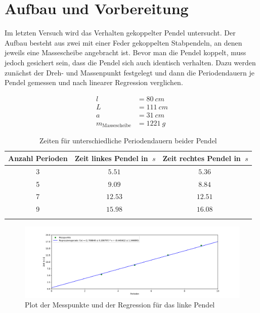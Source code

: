 \section{Aufbau und Vorbereitung}

Im letzten Versuch wird das Verhalten gekoppelter Pendel untersucht. Der Aufbau besteht aus zwei mit einer Feder gekoppelten Stabpendeln, an denen jeweils eine Massescheibe angebracht ist.
Bevor man die Pendel koppelt, muss jedoch gesichert sein, dass die Pendel sich auch identisch verhalten.
Dazu werden zunächst der Dreh- und Massenpunkt festgelegt und dann die Periodendauern je Pendel gemessen und nach linearer Regression verglichen.

\begin{align}
    l &= \SI{80}{cm} \\
    L &= \SI{111}{cm} \\
    a &= \SI{31}{cm} \\
    m_{\text{Massescheibe}} &= \SI{1221}{g}
\end{align}

\begin{table}[h!]
    \begin{center}
        \caption{Zeiten für unterschiedliche Periodendauern beider Pendel}
        \begin{tabular}{ccc}
            \hline
            Anzahl Perioden & Zeit linkes Pendel in $\SI{}{s}$ & Zeit rechtes Pendel in $\SI{}{s}$ \\
            \hline
            3  & $\SI{5,51}{}$ & $\SI{5,36}{}$ \\
            5  & $\SI{9,09}{}$ & $\SI{8,84}{}$  \\
            7  & $\SI{12,53}{}$ & $\SI{12,51}{}$  \\
            9  & $\SI{15,98}{}$ & $\SI{16,08}{}$ \\
            \hline
            \label{tab:Schwingungen-Pendel-einzeln}
        \end{tabular}
    \end{center}
\end{table}

\begin{figure}[h!]
    \centering
    \includegraphics[scale=0.4]{./Pendel/Protokoll/fig/Koppelpendel_Regression_1.pdf}
    \caption{Plot der Messpunkte und der Regression für das linke Pendel}
    \label{fig:Reg_links}
\end{figure}

